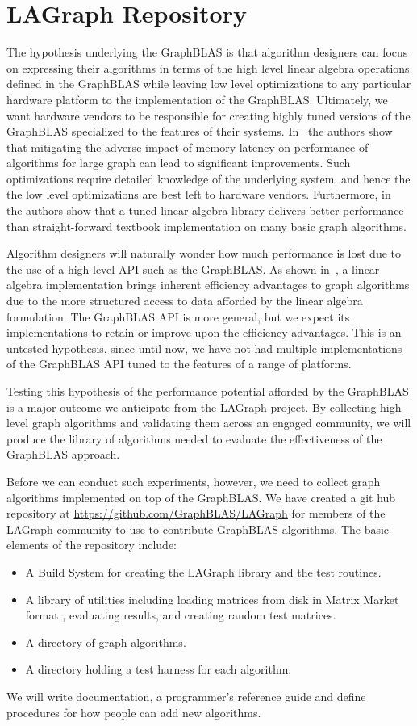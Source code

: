 \section{LAGraph Repository}
\label{sec:repo}

The hypothesis underlying the GraphBLAS is that algorithm designers can focus on expressing their algorithms
in terms of the high level linear algebra operations defined in the GraphBLAS while leaving low level
optimizations to any particular hardware platform to the implementation of the GraphBLAS.  Ultimately, 
we want hardware vendors to be responsible for creating highly tuned versions of the GraphBLAS
specialized to the features of their systems.
In~\cite{KuHPEC2016} the authors show that mitigating the adverse impact of memory
latency on performance of algorithms for large graph can lead to significant improvements.
Such optimizations require detailed knowledge of the underlying system, and hence the 
the low level optimizations are best left to hardware vendors.
Furthermore, in~\cite{KuJour} the authors show that a tuned linear algebra library delivers
better performance than straight-forward textbook implementation on many basic graph algorithms.

Algorithm designers will naturally wonder how much performance is lost due to the use of a high 
level API such as the GraphBLAS.  As shown in~\cite{KuJour}, a linear algebra 
implementation brings inherent efficiency advantages to 
graph algorithms due to the more structured access to data afforded by the linear algebra 
formulation.
The GraphBLAS API is more general, but we expect its implementations to retain or improve upon
the efficiency advantages.
This is an untested hypothesis, since until now, we have not had multiple 
implementations of the GraphBLAS API tuned to the features of a range of platforms.

Testing this hypothesis of the performance potential afforded by the GraphBLAS is a major outcome
we anticipate from the LAGraph project.  By collecting high level graph algorithms and validating them
across an engaged community, we will produce the library of algorithms needed to evaluate the 
effectiveness of the GraphBLAS approach.

Before we can conduct such experiments, however, we need to collect graph algorithms implemented on 
top of the GraphBLAS. We have created a git hub repository at
\url{https://github.com/GraphBLAS/LAGraph} for members of the LAGraph community to 
use to contribute GraphBLAS algorithms. The basic elements of the repository include:
\begin{itemize}
\item A Build System for creating the LAGraph library and the test routines.
\item A library of utilities including loading matrices from disk in Matrix Market format \cite{MM},
    evaluating results, and creating random test matrices.
\item A directory of graph algorithms.
\item A directory holding a test harness for each algorithm.
\end{itemize}

We will write documentation, a programmer's reference guide and define procedures for how people
can add new algorithms.  
